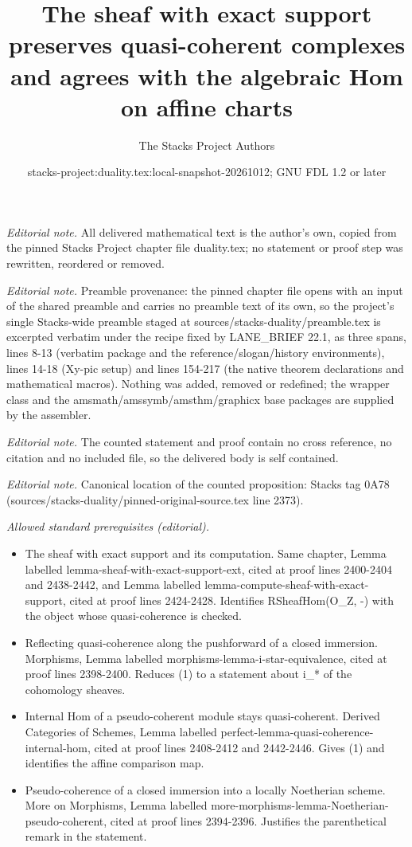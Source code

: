 \documentclass[10pt,a4paper]{amsart}
\title{The sheaf with exact support preserves quasi-coherent complexes and agrees with the algebraic Hom on affine charts}
\author{The Stacks Project Authors}
\date{stacks-project:duality.tex:local-snapshot-20261012; GNU FDL 1.2 or later}
\theoremstyle{plain}
\theoremstyle{definition}
\theoremstyle{remark}
\numberwithin{equation}{subsection}
\begin{document}
\maketitle
\noindent\textit{Editorial note.} All delivered mathematical text is the author's own, copied from the pinned Stacks Project chapter file duality.tex; no statement or proof step was rewritten, reordered or removed.\par\medskip
\noindent\textit{Editorial note.} Preamble provenance: the pinned chapter file opens with an input of the shared preamble and carries no preamble text of its own, so the project's single Stacks-wide preamble staged at sources/stacks-duality/preamble.tex is excerpted verbatim under the recipe fixed by LANE\_BRIEF 22.1, as three spans, lines 8-13 (verbatim package and the reference/slogan/history environments), lines 14-18 (Xy-pic setup) and lines 154-217 (the native theorem declarations and mathematical macros). Nothing was added, removed or redefined; the wrapper class and the amsmath/amssymb/amsthm/graphicx base packages are supplied by the assembler.\par\medskip
\noindent\textit{Editorial note.} The counted statement and proof contain no cross reference, no citation and no included file, so the delivered body is self contained.\par\medskip
\noindent\textit{Editorial note.} Canonical location of the counted proposition: Stacks tag 0A78 (sources/stacks-duality/pinned-original-source.tex line 2373).\par\medskip
\noindent\textit{Allowed standard prerequisites (editorial).}\begin{itemize}
\item The sheaf with exact support and its computation. Same chapter, Lemma labelled lemma-sheaf-with-exact-support-ext, cited at proof lines 2400-2404 and 2438-2442, and Lemma labelled lemma-compute-sheaf-with-exact-support, cited at proof lines 2424-2428. Identifies RSheafHom(O\_Z, -) with the object whose quasi-coherence is checked.
\item Reflecting quasi-coherence along the pushforward of a closed immersion. Morphisms, Lemma labelled morphisms-lemma-i-star-equivalence, cited at proof lines 2398-2400. Reduces (1) to a statement about i\_* of the cohomology sheaves.
\item Internal Hom of a pseudo-coherent module stays quasi-coherent. Derived Categories of Schemes, Lemma labelled perfect-lemma-quasi-coherence-internal-hom, cited at proof lines 2408-2412 and 2442-2446. Gives (1) and identifies the affine comparison map.
\item Pseudo-coherence of a closed immersion into a locally Noetherian scheme. More on Morphisms, Lemma labelled more-morphisms-lemma-Noetherian-pseudo-coherent, cited at proof lines 2394-2396. Justifies the parenthetical remark in the statement.
\end{itemize}\medskip
\end{document}
